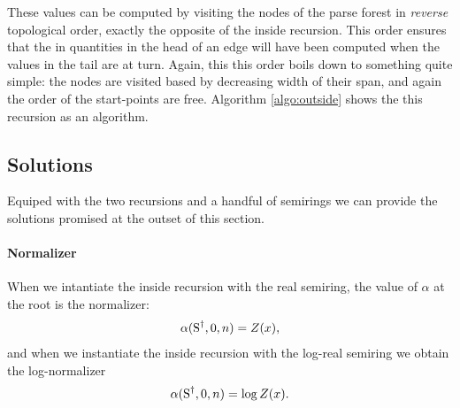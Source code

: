   These values can be computed by visiting the nodes of the parse forest in \textit{reverse} topological order, exactly the opposite of the inside recursion. This order ensures that the in quantities in the head of an edge will have been computed when the values in the tail are at turn. Again, this this order boils down to something quite simple: the nodes are visited based by decreasing width of their span, and again the order of the start-points are free. Algorithm \ref{algo:outside} shows the this recursion as an algorithm.


\subsection{Solutions}
  Equiped with the two recursions and a handful of semirings we can provide the solutions promised at the outset of this section.

  \paragraph{Normalizer}
    When we intantiate the inside recursion with the real semiring, the value of $\alpha$ at the root is the normalizer:
    \begin{align*}
      \alpha(\text{S}^{\dagger}, 0, n) = Z(x),
    \end{align*}
    and when we instantiate the inside recursion with the log-real semiring we obtain the log-normalizer
    \begin{align*}
      \alpha(\text{S}^{\dagger}, 0, n) = \log Z(x).
    \end{align*}

